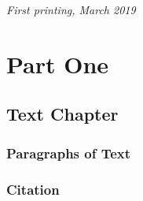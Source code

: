 \documentclass[11pt,fleqn]{book} %
\begin{document}
\noindent \textit{First printing, March 2019} %




\pagestyle{empty} %

\tableofcontents %

\cleardoublepage %

\pagestyle{fancy} %


\part{Part One}



\chapter{Text Chapter}

\section{Paragraphs of Text}

\lipsum[1-7] %


\section{Citation}
\end{document}
